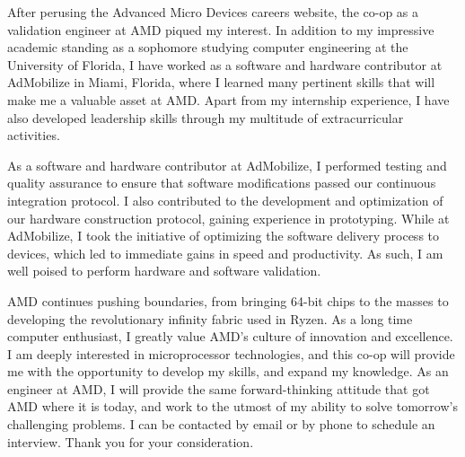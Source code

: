 \documentclass[11pt, a4paper]{awesome-cv}
\begin{document}
\makecvheader

\makelettertitle

\begin{cvletter}
After perusing the Advanced Micro Devices careers website, the co-op as a validation engineer at AMD piqued my interest. In addition to my impressive academic standing as a sophomore studying computer engineering at the University of Florida, I have worked as a software and hardware contributor at AdMobilize in Miami, Florida, where I learned many pertinent skills that will make me a valuable asset at AMD. Apart from my internship experience, I have also developed leadership skills through my multitude of extracurricular activities.

As a software and hardware contributor at AdMobilize, I performed testing and quality assurance to ensure that software modifications passed our continuous integration protocol. I also contributed to the development and optimization of our hardware construction protocol, gaining experience in prototyping. While at AdMobilize, I took the initiative of optimizing the software delivery process to devices, which led to immediate gains in speed and productivity. As such, I am well poised to perform hardware and software validation.

AMD continues pushing boundaries, from bringing 64-bit chips to the masses to developing the revolutionary infinity fabric used in Ryzen. As a long time computer enthusiast, I greatly value AMD's culture of innovation and excellence. I am deeply interested in microprocessor technologies, and this co-op will provide me with the opportunity to develop my skills, and expand my knowledge. As an engineer at AMD, I will provide the same forward-thinking attitude that got AMD where it is today, and work to the utmost of my ability to solve tomorrow's challenging problems. I can be contacted by email or by phone to schedule an interview. Thank you for your consideration.


\end{cvletter}

\makeletterclosing
\end{document}
